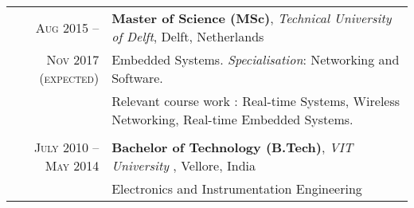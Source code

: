 %
%



\begin{tabular}{rl}	
	\textsc{Aug 2015 --}  			& \textbf{Master of Science (MSc)}, \emph{Technical University of Delft}, Delft, Netherlands\\
	\textsc{Nov 2017 (expected)} 	& Embedded Systems. \emph{Specialisation}: Networking and Software. \\
									&  Relevant course work : Real-time Systems, Wireless Networking, Real-time Embedded Systems. \\ \\
	\textsc{July 2010 --May 2014} 	&  \textbf{Bachelor of Technology (B.Tech)},  \emph{VIT University} , Vellore, India\\
									& Electronics and Instrumentation Engineering \\ 
											
\end{tabular}